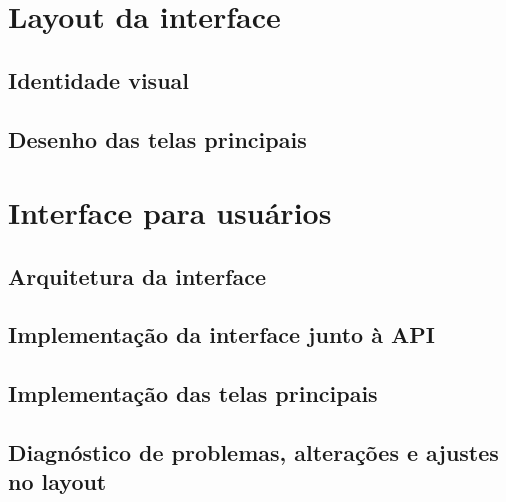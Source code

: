 \section{Layout da interface}
\subsection{Identidade visual}
\subsection{Desenho das telas principais}

\section{Interface para usuários}
\subsection{Arquitetura da interface}
\subsection{Implementação da interface junto à API}
\subsection{Implementação das telas principais}
\subsection{Diagnóstico de problemas, alterações e ajustes no layout}
